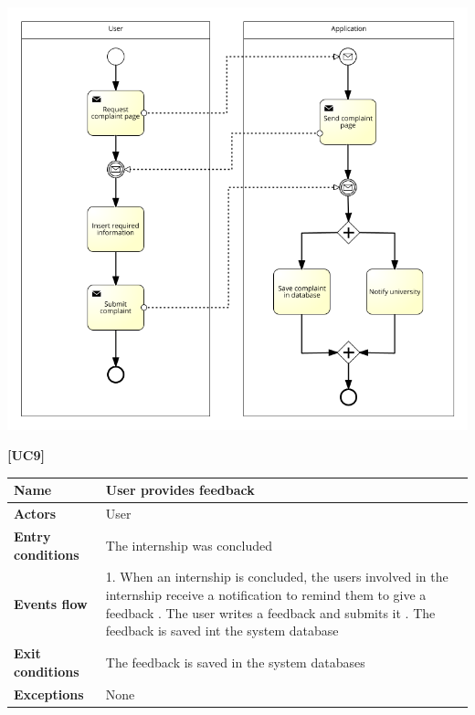 \documentclass[11pt,twoside]{article}
\begin{document}
\begin{center}
\includegraphics[width=\textwidth]{Images/UC8}
\end{center}

\newpage

\large{\textbf{[UC9]}} \\
\begin{table}[H]
\begin{tabular}{| p{} | p{} |}
\hline
\textbf{Name}
& User provides feedback \\
\hline
\textbf{Actors}
& User \\
\hline
\textbf{Entry conditions}
& The internship was concluded \\
\hline
\textbf{Events flow}
& 1. When an internship is concluded, the users involved in the internship receive a notification to remind them to give a feedback \newline
2. The user writes a feedback and submits it \newline
3. The feedback is saved int the system database \\
\hline
\textbf{Exit conditions}
& The feedback is saved in the system databases \\
\hline
\textbf{Exceptions}
& None \\
\hline
\end{tabular}
\end{table}
\end{document}
